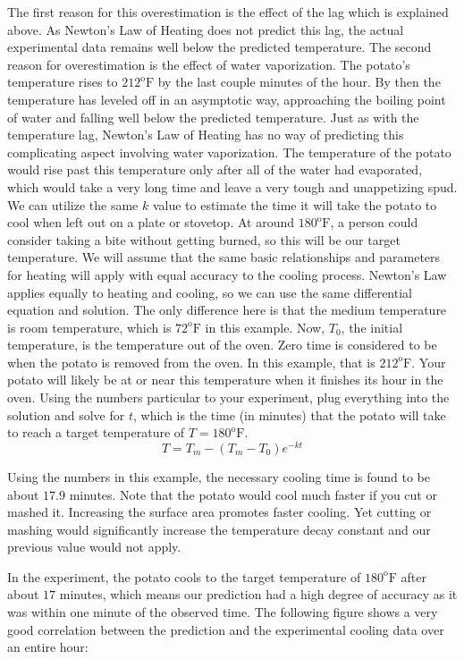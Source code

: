\documentclass{ximera}
\begin{document}
The first reason for this overestimation is the effect of the lag which is explained above.  As Newton's Law of Heating does not predict this lag, the actual experimental data remains well below the predicted temperature.  The second reason for overestimation is the effect of water vaporization.  The potato's temperature rises to $212^{\text{o}}\text{F}$ by the last couple minutes of the hour.  By then the temperature has leveled off in an asymptotic way, approaching the boiling point of water and falling well below the predicted temperature.  Just as with the temperature lag, Newton's Law of Heating has no way of predicting this complicating aspect involving water vaporization.  The temperature of the potato would rise past this temperature only after all of the water had evaporated, which would take a very long time and leave a very tough and unappetizing spud.
We can utilize the same $k$ value to estimate the time it will take the potato to cool when left out on a plate or stovetop.  At around $180^{\text{o}}\text{F}$, a person could consider taking a bite without getting burned, so this will be our target temperature.  We will assume that the same basic relationships and parameters for heating will apply with equal accuracy to the cooling process.  Newton's Law applies equally to heating and cooling, so we can use the same differential equation and solution.  The only difference here is that the medium temperature  is room temperature, which is $72^{\text{o}}\text{F}$ in this example.  Now, $T_0$, the initial temperature, is the temperature out of the oven.  Zero time is considered to be when the potato is removed from the oven.  In this example, that is $212^{\text{o}}\text{F}$.  Your potato will likely be at or near this temperature when it finishes its hour in the oven.  Using the numbers particular to your experiment, plug everything into the solution and solve for $t$, which is the time (in minutes) that the potato will take to reach a target temperature of $T=180^{\text{o}}\text{F}$.
\[
T = T_m-(T_m-T_0)e^{-kt}
\]

Using the numbers in this example, the necessary cooling time is found to be about $17.9$ minutes.  Note that the potato would cool much faster if you cut or mashed it.  Increasing the surface area promotes faster cooling.  Yet cutting or mashing would significantly increase the temperature decay constant and our previous value would not apply.

In the experiment, the potato cools to the target temperature of $180^{\text{o}}\text{F}$ after about $17$ minutes, which means our prediction had a high degree of accuracy as it was within one minute of the observed time.  The following figure shows a very good correlation between the prediction and the experimental cooling data over an entire hour:
\end{document}
